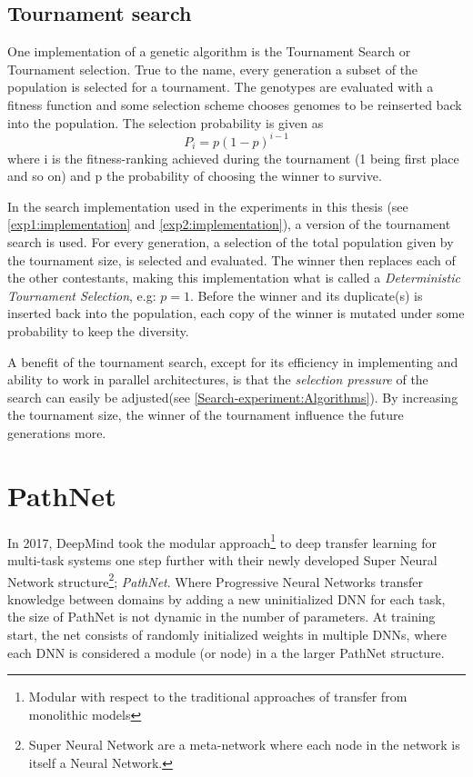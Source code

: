 \subsection{Tournament search}
One implementation of a genetic algorithm is the Tournament Search or Tournament selection. True to the name, every generation a subset of the population is selected for a tournament. The genotypes are evaluated with a fitness function and some selection scheme chooses genomes to be reinserted back into the population. The selection probability is given as 
\begin{equation}
    \label{eq:tournamentsearch}
    P_{i} = p(1-p)^{i-1}
\end{equation}
where i is the fitness-ranking achieved during the tournament (1 being first place and so on) and p the probability of choosing the winner to survive.  

In the search implementation used in the experiments in this thesis (see \ref{exp1:implementation} and \ref{exp2:implementation}), a version of the tournament search is used. For every generation, a selection of the total population given by the tournament size, is selected and evaluated. The winner then replaces each of the other contestants, making this implementation what is called a \textit{Deterministic Tournament Selection}, e.g: \(p=1\). Before the winner and its duplicate(s) is inserted back into the population, each copy of the winner is mutated under some probability to keep the diversity. 

A benefit of the tournament search, except for its efficiency in implementing and ability to work in parallel architectures, is that the \textit{selection pressure} of the search can easily be adjusted(see \ref{Search-experiment:Algorithms}). By increasing the tournament size, the winner of the tournament influence the future generations more.

\section{PathNet}\label{background:pn}
In 2017, DeepMind took the modular approach\footnote{Modular with respect to the traditional approaches of transfer from monolithic models} to deep transfer learning for multi-task systems one step further with their newly developed Super Neural Network structure\footnote{Super Neural Network are a meta-network where each node in the network is itself a Neural Network.}; \textit{PathNet}\cite{pathnet}. Where Progressive Neural Networks transfer knowledge between domains by adding a new uninitialized DNN for each task, the size of PathNet is not dynamic in the number of parameters. At training start, the net consists of randomly initialized weights in multiple DNNs, where each DNN is considered a module (or node) in a the larger PathNet structure. 

